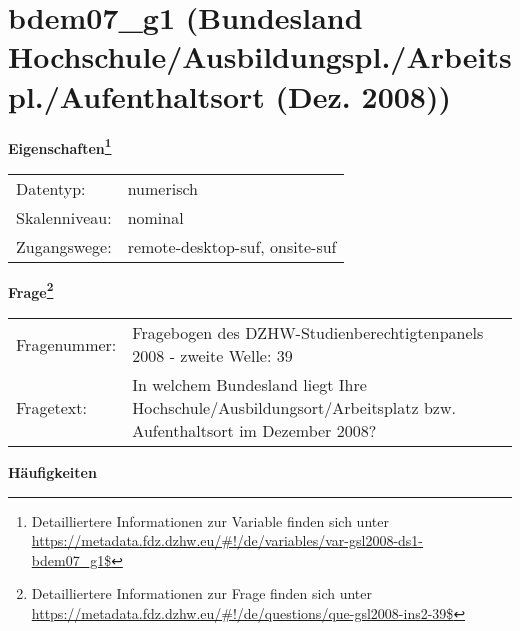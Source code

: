 
    \setcounter{footnote}{0}

    \vspace*{-1.8cm}
	\section{bdem07\_g1 (Bundesland Hochschule/Ausbildungspl./Arbeitspl./Aufenthaltsort (Dez. 2008))}
	\label{section:bdem07_g1}



    \vspace*{0.5cm}
    \noindent\textbf{Eigenschaften\footnote{Detailliertere Informationen zur Variable finden sich unter
		\url{https://metadata.fdz.dzhw.eu/\#!/de/variables/var-gsl2008-ds1-bdem07_g1$}}}\\
	\begin{tabularx}{\hsize}{@{}lX}
	Datentyp: & numerisch \\
	Skalenniveau: & nominal \\
	Zugangswege: &
	  remote-desktop-suf, 
	  onsite-suf
 \\
    \end{tabularx}



				\vspace*{0.5cm}
                \noindent\textbf{Frage\footnote{Detailliertere Informationen zur Frage finden sich unter
		              \url{https://metadata.fdz.dzhw.eu/\#!/de/questions/que-gsl2008-ins2-39$}}}\\
				\begin{tabularx}{\hsize}{@{}lX}
					Fragenummer: &
					  Fragebogen des DZHW-Studienberechtigtenpanels 2008 - zweite Welle:
					  39
 \\
					Fragetext: & In welchem Bundesland liegt Ihre Hochschule/Ausbildungsort/Arbeitsplatz bzw. Aufenthaltsort im Dezember 2008? \\
				\end{tabularx}





        		\vspace*{0.5cm}
                \noindent\textbf{Häufigkeiten}

